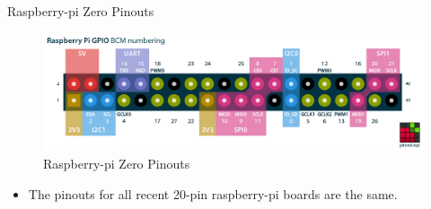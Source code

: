 \begin{frame}
   {Raspberry-pi Zero Pinouts}
   \begin{figure}[H]
      \includegraphics[width=5in]{IMAGES/raspberry-pi-pinout}
      \caption{Raspberry-pi Zero Pinouts}
   \end{figure}
   \begin{itemize}
      \item The pinouts for all recent 20-pin raspberry-pi boards are the same.
   \end{itemize}
\end{frame}

\cprotect{}

